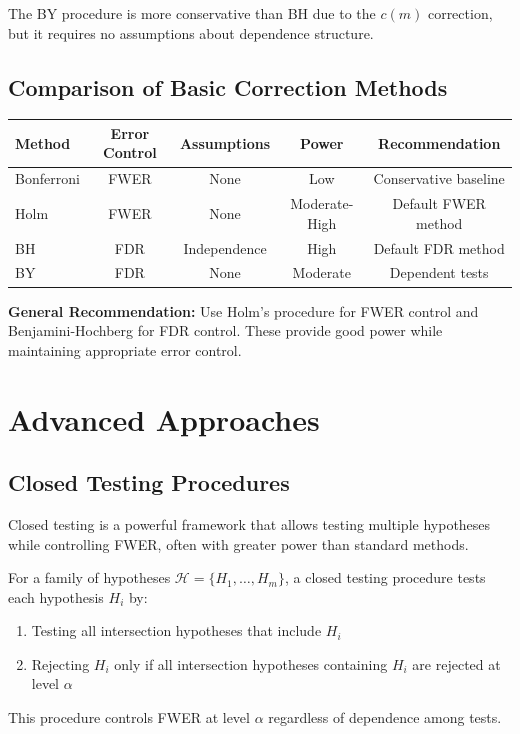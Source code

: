 The BY procedure is more conservative than BH due to the $c(m)$ correction, but it requires no assumptions about dependence structure.

\subsection{Comparison of Basic Correction Methods}

\begin{center}
\begin{tabular}{lcccc}
\toprule
Method & Error Control & Assumptions & Power & Recommendation \\
\midrule
Bonferroni & FWER & None & Low & Conservative baseline \\
Holm & FWER & None & Moderate-High & Default FWER method \\
BH & FDR & Independence & High & Default FDR method \\
BY & FDR & None & Moderate & Dependent tests \\
\bottomrule
\end{tabular}
\end{center}

\textbf{General Recommendation:} Use Holm's procedure for FWER control and Benjamini-Hochberg for FDR control. These provide good power while maintaining appropriate error control.

\section{Advanced Approaches}

\subsection{Closed Testing Procedures}

Closed testing is a powerful framework that allows testing multiple hypotheses while controlling FWER, often with greater power than standard methods.

\begin{definition}
For a family of hypotheses $\mathcal{H} = \{H_1, \ldots, H_m\}$, a closed testing procedure tests each hypothesis $H_i$ by:
\begin{enumerate}
    \item Testing all intersection hypotheses that include $H_i$
    \item Rejecting $H_i$ only if all intersection hypotheses containing $H_i$ are rejected at level $\alpha$
\end{enumerate}

This procedure controls FWER at level $\alpha$ regardless of dependence among tests.
\end{definition}

